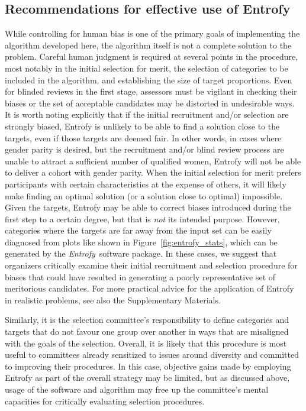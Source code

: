 \documentclass[10pt,letterpaper]{article}
\newcommand{\project}[1]{\textsl{#1}}
\newcommand{\entrofy}{\project{Entrofy}}
\begin{document}
\subsection*{Recommendations for effective use of Entrofy}
While controlling for human bias is one of the primary goals of implementing the algorithm developed here, the algorithm itself is not a complete solution to the problem.
Careful human judgment is required at several points in the procedure, most notably in the initial selection for merit, the selection of categories to be included in the algorithm, and establishing the size of target proportions.
Even for blinded reviews in the first stage, assessors must be vigilant in checking their biases or the set of acceptable candidates may be distorted in undesirable ways.
It is worth noting explicitly that if the initial recruitment and/or selection are strongly biased, Entrofy is unlikely to be able to find a solution close to the targets, even if those targets are deemed fair. 
In other words, in cases where gender parity is desired, but the recruitment and/or blind review process are unable to attract a sufficient number of qualified women, Entrofy will not be able to deliver a cohort with gender parity.
When the initial selection for merit prefers participants with certain characteristics at the expense of others, it will likely make finding an optimal solution (or a solution close to optimal) impossible.
Given the targets, Entrofy may be able to correct biases introduced during the first step to a certain degree, but that is \textit{not} its intended purpose.
However, categories where the targets are far away from the input set can be easily diagnosed from plots like shown in Figure~\ref{fig:entrofy_stats}, which can be generated by the \entrofy\ software package.
In these cases, we suggest that organizers critically examine their initial recruitment and selection procedure for biases that could have resulted in generating a poorly representative set of meritorious candidates. For more practical advice for the application of Entrofy in realistic problems, see also the Supplementary Materials.


Similarly, it is the selection committee's responsibility to define categories and targets that do not favour one group over another in ways that are misaligned with the goals of the selection.
Overall, it is likely that this procedure is most useful to committees already sensitized to issues around diversity and committed to improving their procedures.
In this case, objective gains made by employing Entrofy as part of the overall strategy may be limited, but as discussed above, usage of the software and algorithm may free up the committee's mental capacities for critically evaluating selection procedures.
\end{document}

